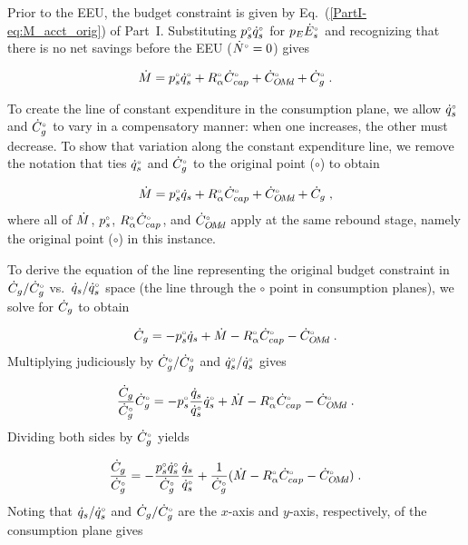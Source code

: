 Prior to the EEU, the budget constraint is given by Eq.~(\ref{PartI-eq:M_acct_orig}) of Part~I.
Substituting $\orig{p}_s \rorig{q}_s$ for $p_E \rorig{E}_s$ and 
recognizing that there is no net savings before the EEU
($\rorig{N} = 0$) gives

\begin{equation}
  \rate{M} = \orig{p}_s \rorig{q}_s + \orig{R}_\alpha \rorig{C}_{cap} + \rorig{C}_{\omd} + \rorig{C}_g \; .
\end{equation}

To create the line of constant expenditure in the consumption plane, 
we allow $\rorig{q}_s$ and $\rorig{C}_g$ to vary in a compensatory manner:
when one increases, the other must decrease.
To show that variation along the constant expenditure line, 
we remove the notation that ties $\rorig{q}_s$ and $\rorig{C}_g$
to the original point ($\circ$) to obtain

\begin{equation}
  \rate{M} = \bempl{p}_s \rate{q}_s + \bempl{R}_\alpha \rbempl{C}_{cap} + \rbempl{C}_{\omd} + \rate{C}_g \; , 
\end{equation}
%
where all of $\rate{M}$, $\bempl{p}_s$, $\bempl{R}_\alpha \rbempl{C}_{cap}$, and $\rbempl{C}_{\omd}$
apply at the same rebound stage, 
namely the original point ($\circ$) in this instance.

To derive the equation of the line representing the original budget constraint 
in $\rate{C}_g/\rbempl{C}_g$ vs.\ $\rate{q}_s/\rbempl{q}_s$ space
(the \circcirc{} line through the $\circ$ point
in consumption planes), 
we solve for $\rate{C}_g$ to obtain

\begin{equation}
  \rate{C}_g = - \bempl{p}_s \rate{q}_s + \rate{M} - \bempl{R}_\alpha \rbempl{C}_{cap} - \rbempl{C}_{\omd} \; .
\end{equation}
%
Multiplying judiciously by $\rbempl{C}_g/\rbempl{C}_g$ and $\rbempl{q}_s/\rbempl{q}_s$ gives

\begin{equation}
  \frac{\rate{C}_g}{\rbempl{C}_g} \rbempl{C}_g
       = - \bempl{p}_s \frac{\rate{q}_s}{\rbempl{q}_s} \rbempl{q}_s 
         + \rate{M} - \bempl{R}_\alpha \rbempl{C}_{cap} - \rbempl{C}_{\omd} \; .
\end{equation}
%
Dividing both sides by $\rbempl{C}_g$ yields

\begin{equation}
  \frac{\rate{C}_g}{\rbempl{C}_g}
       = - \frac{\bempl{p}_s \rbempl{q}_s}{\rbempl{C}_g} \frac{\rate{q}_s}{\rbempl{q}_s}
         + \frac{1}{\rbempl{C}_g} (\rate{M} - \bempl{R}_\alpha \rbempl{C}_{cap} - \rbempl{C}_{\omd}) \; .
\end{equation}
%
Noting that  
$\rate{q}_s/\rbempl{q}_s$ and 
$\rate{C}_g/\rbempl{C}_g$ are
the $x$-axis and $y$-axis, respectively,
of the consumption plane gives

